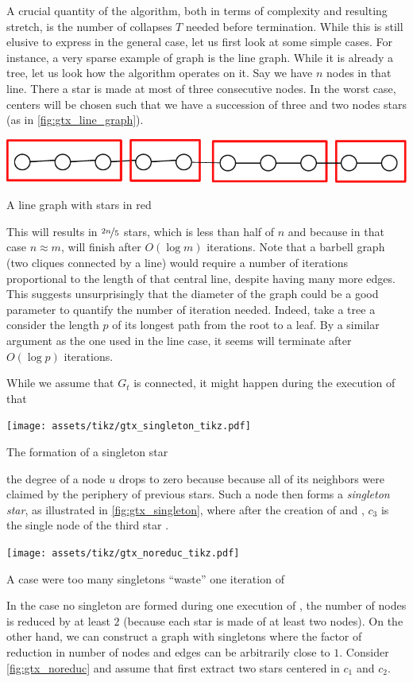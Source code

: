A crucial quantity of the \gtx{} algorithm, both in terms of complexity and resulting stretch, is
the number of collapses $T$ needed before termination. While this is still elusive to express in the
general case, let us first look at some simple cases. For instance, a very sparse example of graph
is the line graph. While it is already a tree, let us look how the \gtx{} algorithm operates on it.
Say we have $n$ nodes in that line. There a star is made at most of three consecutive nodes. In the
worst case, centers will be chosen such that we have a succession of three and two nodes stars (as
in \autoref{fig:gtx_line_graph}).%
\begin{marginfigure}
  \centering
  \includegraphics[width=0.9\linewidth]{assets/tmp-code/line_graph.pdf}
  \caption{A line graph with stars in red}
  \label{fig:gtx_line_graph}
\end{marginfigure}
This will results in $\nicefrac{2n}{5}$ stars, which is less than half of $n$ and because in that
case $n\approx m$, \gtx{} will finish after $O(\log m)$ iterations. Note that a barbell graph (two
cliques connected by a line) would require a number of iterations proportional to the length of that
central line, despite having many more edges. This suggests unsurprisingly that the diameter of the graph
could be a good parameter to quantify the number of iteration needed. Indeed, take a tree a consider
the length $p$ of its longest path from the root to a leaf. By a similar argument as the one used in
the line case, it seems \gtx{} will terminate after $O(\log p)$ iterations.

While we assume that $G_t$ is connected, it might happen during the execution of \extractStar{} that%
\begin{marginfigure}
  \centering
  \texttt{[image: assets/tikz/gtx\_singleton\_tikz.pdf]}
  \caption{The formation of a singleton star}
  \label{fig:gtx_singleton}
\end{marginfigure}
the degree of a node $u$ drops to zero because because all of its neighbors were claimed by the
periphery of previous stars. Such a node then forms a \emph{singleton star}, as illustrated in
\autoref{fig:gtx_singleton}, where after the creation of  and , $c_3$ is the
single node of the third star .%
\begin{marginfigure}
  \centering
  \texttt{[image: assets/tikz/gtx\_noreduc\_tikz.pdf]}
  \caption{A case were too many singletons \enquote{waste} one iteration of \gtx{}}
  \label{fig:gtx_noreduc}
\end{marginfigure}
In the case no singleton are formed during one execution of \extractStar{}, the number of nodes is
reduced by at least $2$ (because each star is made of at least two nodes). On the other hand, we can
construct a graph with singletons where the factor of reduction in number of nodes and edges can be
arbitrarily close to $1$. Consider \autoref{fig:gtx_noreduc} and assume that first extract two stars
centered in $c_1$ and $c_2$.%

